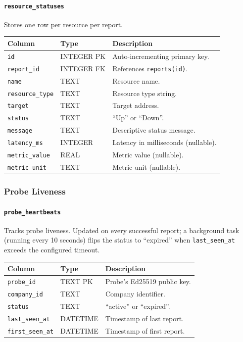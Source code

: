 \documentclass[12pt]{report}
\begin{document}
\paragraph{\texttt{resource\_statuses}} Stores one row per resource per
report.

\begin{longtable}{@{} l l p{6cm} @{}}
\toprule
\textbf{Column} & \textbf{Type} & \textbf{Description} \\
\midrule
\texttt{id} & INTEGER PK & Auto-incrementing primary key. \\
\texttt{report\_id} & INTEGER FK & References \texttt{reports(id)}. \\
\texttt{name} & TEXT & Resource name. \\
\texttt{resource\_type} & TEXT & Resource type string. \\
\texttt{target} & TEXT & Target address. \\
\texttt{status} & TEXT & ``Up'' or ``Down''. \\
\texttt{message} & TEXT & Descriptive status message. \\
\texttt{latency\_ms} & INTEGER & Latency in milliseconds (nullable). \\
\texttt{metric\_value} & REAL & Metric value (nullable). \\
\texttt{metric\_unit} & TEXT & Metric unit (nullable). \\
\bottomrule
\end{longtable}

\subsubsection{Probe Liveness}

\paragraph{\texttt{probe\_heartbeats}} Tracks probe liveness. Updated on
every successful report; a background task (running every 10 seconds) flips
the status to ``expired'' when \texttt{last\_seen\_at} exceeds the configured
timeout.

\begin{longtable}{@{} l l p{6cm} @{}}
\toprule
\textbf{Column} & \textbf{Type} & \textbf{Description} \\
\midrule
\texttt{probe\_id} & TEXT PK & Probe's Ed25519 public key. \\
\texttt{company\_id} & TEXT & Company identifier. \\
\texttt{status} & TEXT & ``active'' or ``expired''. \\
\texttt{last\_seen\_at} & DATETIME & Timestamp of last report. \\
\texttt{first\_seen\_at} & DATETIME & Timestamp of first report. \\
\bottomrule
\end{longtable}
\end{document}
